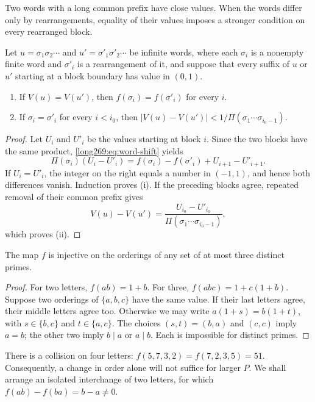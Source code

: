 Two words with a long common prefix have close values. When the words
differ only by rearrangements, equality of their values imposes a stronger
condition on every rearranged block.

\begin{remark}\label{long269:res:dp-blocks}
Let $u=\sigma_1\sigma_2\cdots$ and $u'=\sigma'_1\sigma'_2\cdots$ be infinite
words, where each $\sigma_i$ is a nonempty finite word and $\sigma'_i$ is a
rearrangement of it, and suppose that every suffix of $u$ or $u'$ starting
at a block boundary has value in $(0,1)$.
\begin{enumerate}[label=\textup{(\roman*)}]
\item If $V(u)=V(u')$, then $f(\sigma_i)=f(\sigma'_i)$ for every $i$.
\item If $\sigma_i=\sigma'_i$ for every $i<i_0$, then
$|V(u)-V(u')|<1/\Pi(\sigma_1\cdots\sigma_{i_0-1})$.
\end{enumerate}
\end{remark}
\begin{proof}
Let $U_i$ and $U'_i$ be the values starting at block $i$. Since the two
blocks have the same product, \eqref{long269:eq:word-shift} yields
\[
 \Pi(\sigma_i)(U_i-U'_i)
 =f(\sigma_i)-f(\sigma'_i)+U_{i+1}-U'_{i+1}.
\]
If $U_i=U'_i$, the integer on the right equals a number in $(-1,1)$,
and hence both differences vanish. Induction proves (i). If the preceding
blocks agree, repeated removal of their common prefix gives
\[
 V(u)-V(u')=\frac{U_{i_0}-U'_{i_0}}
 {\Pi(\sigma_1\cdots\sigma_{i_0-1})},
\]
which proves (ii).
\end{proof}

\begin{remark}\label{long269:res:dp-short}
The map $f$ is injective on the orderings of any set of at most three
distinct primes.
\end{remark}
\begin{proof}
For two letters, $f(ab)=1+b$. For three,
$f(abc)=1+c(1+b)$. Suppose two orderings of $\{a,b,c\}$ have the same
value. If their last letters agree, their middle letters agree too.
Otherwise we may write
$a(1+s)=b(1+t)$, with $s\in\{b,c\}$ and $t\in\{a,c\}$.
The choices $(s,t)=(b,a)$ and $(c,c)$ imply $a=b$; the other two imply
$b\mid a$ or $a\mid b$. Each is impossible for distinct primes.
\end{proof}

There is a collision on four letters:
$f(5,7,3,2)=f(7,2,3,5)=51$. Consequently, a change in order alone will not
suffice for larger $P$. We shall arrange an isolated interchange of two
letters, for which $f(ab)-f(ba)=b-a\ne0$.

